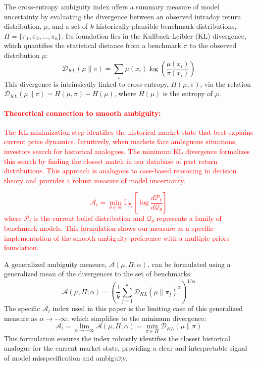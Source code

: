 \documentclass[preprint,12pt,authoryear]{elsarticle}
\begin{document}
The cross-entropy ambiguity index offers a summary measure of model uncertainty by evaluating the divergence between an observed intraday return distribution, $\mu$, and a set of $k$ historically plausible benchmark distributions, $\Pi = \{\pi_1, \pi_2, \dots, \pi_k\}$. Its foundation lies in the Kullback-Leibler (KL) divergence, which quantifies the statistical distance from a benchmark $\pi$ to the observed distribution $\mu$:
\begin{equation}
    \mathcal{D}_{KL}(\mu \| \pi) = \sum_{i} \mu(x_i) \log\left(\frac{\mu(x_i)}{\pi(x_i)}\right)
\end{equation}
\label{eq:kl-min}
This divergence is intrinsically linked to cross-entropy, $H(\mu, \pi)$, via the relation $\mathcal{D}_{KL}(\mu \| \pi) = H(\mu, \pi) - H(\mu)$, where $H(\mu)$ is the entropy of $\mu$.

\textcolor{red}{\paragraph{Theoretical connection to smooth ambiguity:} The KL minimization step identifies the historical market state that best explains current price dynamics. Intuitively, when markets face ambiguous situations, investors search for historical analogues. The minimum KL divergence formalizes this search by finding the closest match in our database of past return distributions. This approach is analogous to case-based reasoning in decision theory and provides a robust measure of model uncertainty.}
\textcolor{red}{
\begin{equation}
\mathcal{A}_t = \min_{\theta \in \Theta} \mathbb{E}_{\mathcal{P}_t} \left[ \log \frac{d\mathcal{P}_t}{d\mathcal{Q}_\theta} \right]
\end{equation}
where $\mathcal{P}_t$ is the current belief distribution and $\mathcal{Q}_\theta$ represents a family of benchmark models. This formulation shows our measure as a specific implementation of the smooth ambiguity preference with a multiple priors foundation.
}

A generalized ambiguity measure, $\mathcal{A}(\mu, \Pi; \alpha)$, can be formulated using a generalized mean of the divergences to the set of benchmarks:
\begin{equation}
    \mathcal{A}(\mu, \Pi; \alpha) = \left( \frac{1}{k} \sum_{j=1}^{k} \mathcal{D}_{KL}(\mu \| \pi_j)^{\alpha} \right)^{1/\alpha}
\end{equation}
The specific $\mathcal{A}_t$ index used in this paper is the limiting case of this generalized measure as $\alpha \to -\infty$, which simplifies to the minimum divergence:
\begin{equation}
    \mathcal{A}_t = \lim_{\alpha \to -\infty} \mathcal{A}(\mu, \Pi; \alpha) = \min_{\pi \in \Pi} \mathcal{D}_{KL}(\mu \| \pi)
\end{equation}
This formulation ensures the index robustly identifies the closest historical analogue for the current market state, providing a clear and interpretable signal of model misspecification and ambiguity.
\end{document}
